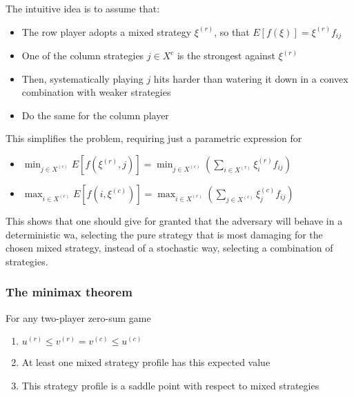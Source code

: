 The intuitive idea is to assume that:
\begin{itemize}
	\item The row player adopts a mixed strategy $\xi^{(r)}$, so that $E\left[f(\xi)\right] = \xi^{(r)} f_{ij}$
	
	\item One of the column strategies $j \in X^c$ is the strongest against $\xi^{(r)}$
	
	\item Then, systematically playing $j$ hits harder than watering it down in a convex combination with weaker strategies
	
	\item Do the same for the column player
\end{itemize}

This simplifies the problem, requiring just a parametric expression for
\begin{itemize}
	\item $\min_{j \in X^{(c)}} E \left[f(\xi^{(r)}, j)\right] = \min_{j \in X^{(c)}} \left(\sum_{i \in X^{(r)}} \xi^{(r)}_i f_{ij} \right)$
	
	\item $\max_{i \in X^{(r)}} E \left[f(i, \xi^{(c)})\right] = \max_{i \in X^{(r)}} \left(\sum_{j \in X^{(c)}} \xi^{(c)}_j f_{ij}\right)$
\end{itemize}

This shows that one should give for granted that the adversary will behave in a deterministic wa, selecting the pure strategy that is most damaging for the chosen mixed strategy, instead of a stochastic way, selecting a combination of strategies. 

\subsubsection{The minimax theorem}

\begin{theo}
	For any two-player zero-sum game
	\begin{enumerate}
		\item $u^{(r)} \leq v^{(r)} = v^{(c)} \leq u^{(c)}$
		
		\item At least one mixed strategy profile has this expected value
		
		\item This strategy profile is a saddle point with respect to mixed strategies
	\end{enumerate}
\end{theo}

